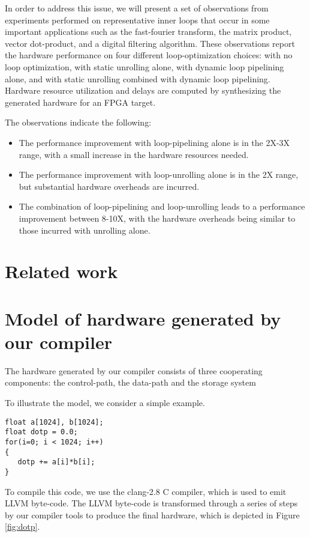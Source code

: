 \documentclass[conference]{IEEEtran}
\begin{document}
In order to address this issue, we will present a set of observations from
experiments performed on representative inner loops that occur in 
some important applications such as the fast-fourier transform, the
matrix product, vector dot-product, and a digital filtering algorithm.
These observations report the hardware performance on four different
loop-optimization choices: with no loop optimization, with static unrolling
alone, with dynamic loop pipelining alone, and with static unrolling combined with
dynamic loop pipelining.  Hardware resource utilization and delays are
computed by synthesizing the generated hardware for an FPGA target.

The observations indicate the following:
\begin{itemize}
\item The performance improvement with loop-pipelining alone is in the
2X-3X range, with a small increase in the hardware resources needed.
\item The performance improvement with loop-unrolling alone is in the 
2X range, but substantial hardware overheads are incurred.
\item The combination of loop-pipelining and loop-unrolling leads
to a performance improvement between 8-10X, with the hardware overheads
being similar to those incurred with unrolling alone.
\end{itemize}


\section{Related work}




\section{Model of hardware generated by our compiler}

The hardware generated by our compiler consists of three
cooperating components: the control-path, the data-path and
the storage system \cite{ahir}

To illustrate the model, we consider a simple example.
\begin{verbatim}
float a[1024], b[1024];
float dotp = 0.0;
for(i=0; i < 1024; i++)
{
   dotp += a[i]*b[i];
}
\end{verbatim}
To compile this code, we use the clang-2.8 \cite{clang} C compiler, 
which is used to emit LLVM \cite{llvm} byte-code.  The LLVM byte-code
is transformed through a series of steps by our compiler tools to
produce the final hardware, which is depicted in Figure \ref{fig:dotp}.
\end{document}

